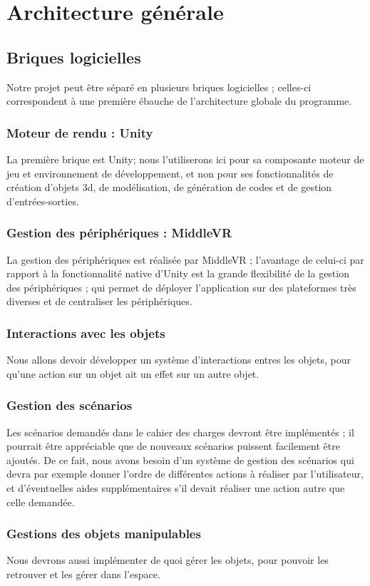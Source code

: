 \section{Architecture générale}
	\subsection{Briques logicielles}
		Notre projet peut être séparé en plusieurs briques logicielles ; celles-ci correspondent à une première ébauche de l'architecture globale du programme.
		\subsubsection{Moteur de rendu : Unity}
			La première brique est Unity; nous l'utiliserons ici pour sa composante moteur de jeu et environnement de développement, et non pour ses fonctionnalités de création d'objets 3d, de modélisation, de génération de codes et de gestion d'entrées-sorties.
		\subsubsection{Gestion des périphériques : MiddleVR}
			La gestion des périphériques est réalisée par MiddleVR ; l'avantage de celui-ci par rapport à la fonctionnalité native d'Unity est la grande flexibilité de la gestion des périphériques ; qui permet de déployer l'application sur des plateformes très diverses et de centraliser les périphériques.
		\subsubsection{Interactions avec les objets}
			Nous allons devoir développer un système d'interactions entres les objets, pour qu'une action sur un objet ait un effet sur un autre objet.
		\subsubsection{Gestion des scénarios}
			Les scénarios demandés dans le cahier des charges devront être implémentés ; il pourrait être appréciable que de nouveaux scénarios puissent facilement être ajoutés.
			De ce fait, nous avons besoin d'un système de gestion des scénarios qui devra par exemple donner l'ordre de différentes actions à réaliser par l'utilisateur, et d'éventuelles aides supplémentaires s'il devait réaliser une action autre que celle demandée.
		\subsubsection{Gestions des objets manipulables}
			Nous devrons aussi implémenter de quoi gérer les objets, pour pouvoir les retrouver et les gérer dans l'espace.
